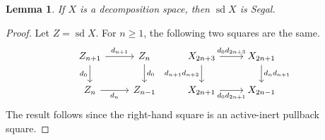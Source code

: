\documentclass{conm-p-l}
\newtheorem{lemma}[theorem]{Lemma}
\theoremstyle{definition}
\theoremstyle{remark}
\DeclareMathOperator{\sd}{sd}
\begin{document}
\begin{lemma}\label{lem decomp implies sd Segal}
If $X$ is a decomposition space, then $\sd X$ is Segal.
\end{lemma}
\begin{proof}
Let $Z = \sd X$.
For $n\geq 1$, the following two squares are the same.
\[ \begin{tikzcd}
Z_{n+1} \rar{d_{n+1}} \dar[swap]{d_0}  & Z_n \dar{d_0} 
&  
X_{2n+3} \rar{d_0d_{2n+3}} \dar[swap]{d_{n+1}d_{n+2}}  & X_{2n+1} \dar{d_n d_{n+1}}
\\
Z_n \rar[swap]{d_n} & Z_{n-1}
&  
X_{2n+1} \rar[swap]{d_0d_{2n+1}} & X_{2n-1}
\end{tikzcd} \]
The result follows since the right-hand square is an active-inert pullback square.
\end{proof}
\end{document}
